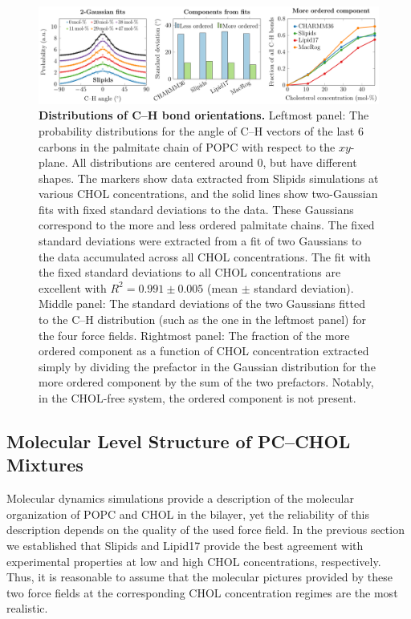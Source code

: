 \documentclass[journal=jctcce]{achemso}
\begin{document}
\begin{figure}[htb!]
    \centering
    \includegraphics[width=\linewidth]{../FIGS/CH.pdf}
    \caption{\label{fig:chdist}%
    \textbf{Distributions of C--H bond orientations.}
    Leftmost panel: The probability distributions for the angle of C--H vectors of the last 6 carbons in the palmitate chain of POPC with respect to the $xy$-plane. All distributions are centered around 0, but have different shapes. The markers show data extracted from Slipids simulations at various CHOL concentrations, and the solid lines show two-Gaussian fits with fixed standard deviations to the data. These Gaussians correspond to the more and less ordered palmitate chains. The fixed standard deviations were extracted from a fit of two Gaussians to the data accumulated across all CHOL concentrations. The fit with the fixed standard deviations to all CHOL concentrations are excellent with $R^2=0.991\pm 0.005$ (mean $\pm$ standard deviation).
    Middle panel: The standard deviations of the two Gaussians fitted to the C--H distribution (such as the one in the leftmost panel) for the four force fields. 
    Rightmost panel: The fraction of the more ordered component as a function of CHOL concentration extracted simply by dividing the prefactor in the Gaussian distribution for the more ordered component by the sum of the two prefactors. Notably, in the CHOL-free system, the ordered component is not present.
    }
\end{figure}




\subsection{Molecular Level Structure of PC--CHOL Mixtures}

Molecular dynamics simulations provide a description of the molecular organization of POPC and CHOL in the bilayer, yet the reliability of this description depends on the quality of the used force field. In the previous section we established that Slipids and Lipid17 provide the best agreement with experimental properties at low and high CHOL concentrations, respectively. Thus, it is reasonable to assume that the molecular pictures provided by these two force fields at the corresponding CHOL concentration regimes are the most realistic.
\end{document}
